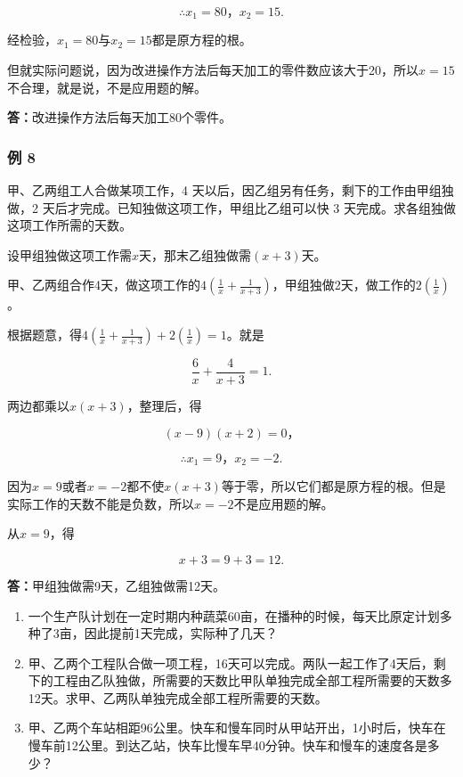 \[
\therefore x _ {1} = 80\text{，} x _ {2} = 15.
\]

经检验，\(x_{1} = 80\)与\(x_{2} = 15\)都是原方程的根。

但就实际问题说，因为改进操作方法后每天加工的零件数应该大于20，所以\(x = 15\)不合理，就是说，不是应用题的解。

\textbf{答：}改进操作方法后每天加工80个零件。

\subsubsection{例 8}

甲、乙两组工人合做某项工作，4
天以后，因乙组另有任务，剩下的工作由甲组独做，2
天后才完成。已知独做这项工作，甲组比乙组可以快 3
天完成。求各组独做这项工作所需的天数。

设甲组独做这项工作需\(x\)天，那末乙组独做需\((x + 3)\)天。

甲、乙两组合作4天，做这项工作的\(4\left(\frac{1}{x}+\frac{1}{x+3}\right)\)，甲组独做2天，做工作的\(2\left(\frac{1}{x}\right)\)。

根据题意，得\(4\left(\frac{1}{x} + \frac{1}{x + 3}\right) + 2\left(\frac{1}{x}\right) = 1\)。就是

\[
\frac{6}{x} + \frac{4}{x + 3} = 1.
\]

两边都乘以\(x(x + 3)\)，整理后，得

\[
(x - 9) (x + 2) = 0\text{，}
\]

\[
\therefore x _ {1} = 9\text{，} x _ {2} = - 2.
\]

因为\(x = 9\)或者\(x = -2\)都不使\(x(x + 3)\)等于零，所以它们都是原方程的根。但是实际工作的天数不能是负数，所以\(x = -2\)不是应用题的解。

从\(x = 9\)，得

\[
x + 3 = 9 + 3 = 12.
\]

\textbf{答：}甲组独做需9天，乙组独做需12天。

\begin{enumerate}
\item
  一个生产队计划在一定时期内种蔬菜60亩，在播种的时候，每天比原定计划多种了3亩，因此提前1天完成，实际种了几天？
\item
  甲、乙两个工程队合做一项工程，16天可以完成。两队一起工作了4天后，剩下的工程由乙队独做，所需要的天数比甲队单独完成全部工程所需要的天数多12天。求甲、乙两队单独完成全部工程所需要的天数。
\item
  甲、乙两个车站相距96公里。快车和慢车同时从甲站开出，1小时后，快车在慢车前12公里。到达乙站，快车比慢车早40分钟。快车和慢车的速度各是多少？
\end{enumerate}


